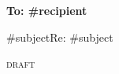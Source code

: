 \par\noindent\textbf{To: #recipient}\par
\ifx\relax#subject\relax\else\noindent Re: #subject\par\fi
\ifltDraft\par\noindent\textsc{draft}\par\fi
